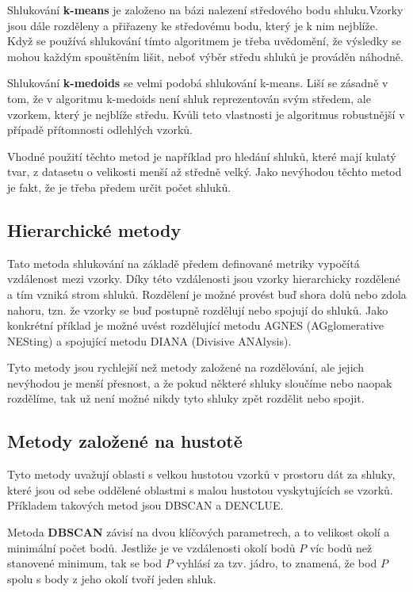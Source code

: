 Shlukování \textbf{k-means} je založeno na bázi nalezení středového bodu shluku.Vzorky jsou dále rozděleny a přiřazeny ke středovému bodu, který je k nim nejblíže. Když se používá shlukování tímto algoritmem je třeba uvědomění, že výsledky se mohou každým spouštěním lišit, neboť výběr středu shluků je prováděn náhodně. \cite{Kantardzic}

Shlukování \textbf{k-medoids} se velmi podobá shlukování k-means. Liší se zásadně v tom, že v algoritmu k-medoids není shluk reprezentován svým středem, ale vzorkem, který je nejblíže středu. Kvůli teto vlastnosti je algoritmus robustnější v případě přítomnosti odlehlých vzorků. \cite{Han}

Vhodné použití těchto metod je například pro hledání shluků, které mají kulatý tvar, z datasetu o velikosti menší až středně velký. Jako nevýhodou těchto metod je fakt, že je třeba předem určit počet shluků.

\subsection*{Hierarchické metody}
Tato metoda shlukování na základě předem definované metriky vypočítá vzdálenost mezi vzorky. Díky této vzdálenosti jsou vzorky hierarchicky rozdělené a tím vzniká strom shluků. Rozdělení je možné provést buď shora dolů nebo zdola nahoru, tzn. že vzorky se buď postupně rozdělují nebo spojují do shluků. Jako konkrétní příklad je možné uvést rozdělující metodu AGNES (AGglomerative NESting) a spojující metodu DIANA (Divisive ANAlysis). \cite{Han} 

Tyto metody jsou rychlejší než metody založené na rozdělování, ale jejich nevýhodou je menší přesnost, a že pokud některé shluky sloučíme nebo naopak rozdělíme, tak už není možné nikdy tyto shluky zpět rozdělit nebo spojit.

\subsection*{Metody založené na hustotě}
Tyto metody uvažují oblasti s velkou hustotou vzorků v prostoru dát za shluky, které jsou od sebe oddělené oblastmi s malou hustotou vyskytujících se vzorků. Příkladem takových metod jsou DBSCAN a DENCLUE. \cite{Han}

Metoda \textbf{DBSCAN} závisí na dvou klíčových parametrech, a to velikost okolí a minimální počet bodů. Jestliže je ve vzdálenosti okolí bodů $P$ víc bodů než stanovené minimum, tak se bod $P$ vyhlásí za tzv. jádro, to znamená, že bod $P$ spolu s body z jeho okolí tvoří jeden shluk. \cite{Kantardzic}

